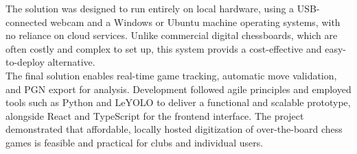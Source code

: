 The solution was designed to run entirely on local hardware, using a USB-connected webcam and a Windows or Ubuntu machine operating systems, with no reliance on cloud services. Unlike commercial digital chessboards, which are often costly and complex to set up, this system provids a cost-effective and easy-to-deploy alternative. \\

The final solution enables real-time game tracking, automatic move validation, and PGN export for analysis. Development followed agile principles and employed tools such as Python and LeYOLO to deliver a functional and scalable prototype, alongside React and TypeScript for the frontend interface. The project demonstrated that affordable, locally hosted digitization of over-the-board chess games is feasible and practical for clubs and individual users.